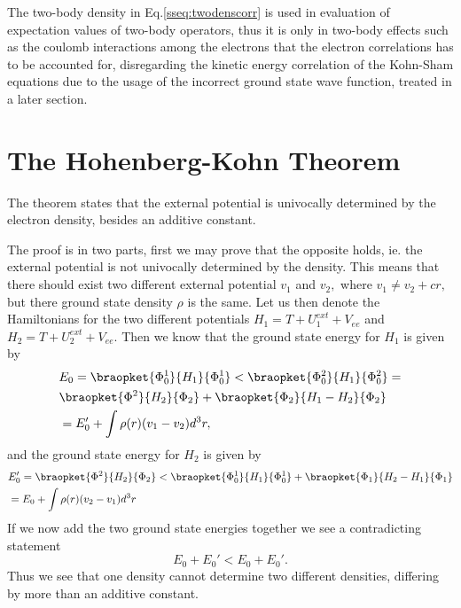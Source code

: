 \documentclass[a4paper,10pt,english]{article}%
\begin{document}
The two-body density in Eq.\eqref{sseq:twodenscorr} is used in evaluation
of expectation values of two-body operators, thus it is only in two-body effects
such as the coulomb interactions among the electrons that the
electron correlations has to be accounted for, disregarding the kinetic energy correlation of
the Kohn-Sham equations due to the usage of the incorrect ground state wave function, treated in a later section.





\section{The Hohenberg-Kohn Theorem}
The theorem states that the external potential is univocally determined by the 
electron density, besides an additive constant.

The proof is in two parts, first we may prove that the opposite holds, ie. the
external potential is not univocally determined by the density. This means that
there should exist two different external potential $v_1$ and $v_2,$ where
$v_1\neq v_2 +cr,$ but there ground state density $\rho$ is the same. Let us
then denote the Hamiltonians for the two different potentials $H_1=T+U^{ext}_1+V_{ee}$ and $H_2=T+U^{ext}_2+V_{ee}.$ Then we know that the ground state
energy for $H_1$ is given by 
\begin{equation*}
        \begin{split}
                &E_0=\braopket{\Phi^1_0}{H_1}{\Phi^1_{0}}<\braopket{\Phi^2_0}{H_1}{\Phi^2_0}=\\
                &\braopket{\Phi^2}{H_2}{\Phi_2}+\braopket{\Phi_2}{H_1-H_2}{\Phi_2}\\
                &=E_0'+\int\rho(r)(v_1-v_2)d^3r,
        \end{split}
\end{equation*}
 and the ground state energy for $H_2$ is given by
\begin{equation*}
        \begin{split}
                &E_0'=\braopket{\Phi^2}{H_2}{\Phi_2}<\braopket{\Phi^1_0}{H_1}{\Phi^1_{0}}+\braopket{\Phi_1}{H_2-H_1}{\Phi_1}\\
                &=E_0+\int\rho(r)(v_2-v_1)d^3r
        \end{split}
        \label{sc1eq:1}
\end{equation*}
If we now add the two ground state energies together we see a contradicting 
statement
\begin{equation*}
       E_0+E_0'<E_0+E_0'.
        \label{sqeq:contr}
\end{equation*}
Thus we see that one density cannot determine two different densities, differing
by more than an additive constant.\\
\end{document}
